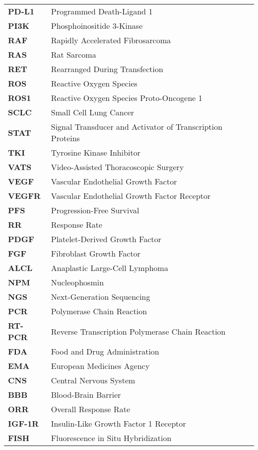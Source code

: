 \begin{longtable}[l]{l l}
    \textbf{PD-L1} & Programmed Death-Ligand 1 \\
    \textbf{PI3K} & Phosphoinositide 3-Kinase \\
    \textbf{RAF} & Rapidly Accelerated Fibrosarcoma \\
    \textbf{RAS} & Rat Sarcoma \\
    \textbf{RET} & Rearranged During Transfection \\
    \textbf{ROS} & Reactive Oxygen Species \\
    \textbf{ROS1} & Reactive Oxygen Species Proto-Oncogene 1 \\
    \textbf{SCLC} & Small Cell Lung Cancer \\
    \textbf{STAT} & Signal Transducer and Activator of Transcription Proteins \\
    \textbf{TKI} & Tyrosine Kinase Inhibitor \\
    \textbf{VATS} & Video-Assisted Thoracoscopic Surgery \\
    \textbf{VEGF} & Vascular Endothelial Growth Factor \\
    \textbf{VEGFR} & Vascular Endothelial Growth Factor Receptor \\
    \textbf{PFS} & Progression-Free Survival \\
    \textbf{RR} & Response Rate \\
    \textbf{PDGF} & Platelet-Derived Growth Factor \\
    \textbf{FGF} & Fibroblast Growth Factor \\
    \textbf{ALCL} & Anaplastic Large-Cell Lymphoma \\
    \textbf{NPM} & Nucleophosmin \\
    \textbf{NGS} & Next-Generation Sequencing \\
    \textbf{PCR} & Polymerase Chain Reaction \\
    \textbf{RT-PCR} & Reverse Transcription Polymerase Chain Reaction \\
    \textbf{FDA} & Food and Drug Administration \\
    \textbf{EMA} & European Medicines Agency \\
    \textbf{CNS} & Central Nervous System \\
    \textbf{BBB} & Blood-Brain Barrier \\
    \textbf{ORR} &  Overall Response Rate \\
    \textbf{IGF-1R} & Insulin-Like Growth Factor 1 Receptor \\
    \textbf{FISH} & Fluorescence in Situ Hybridization \\

\end{longtable}
